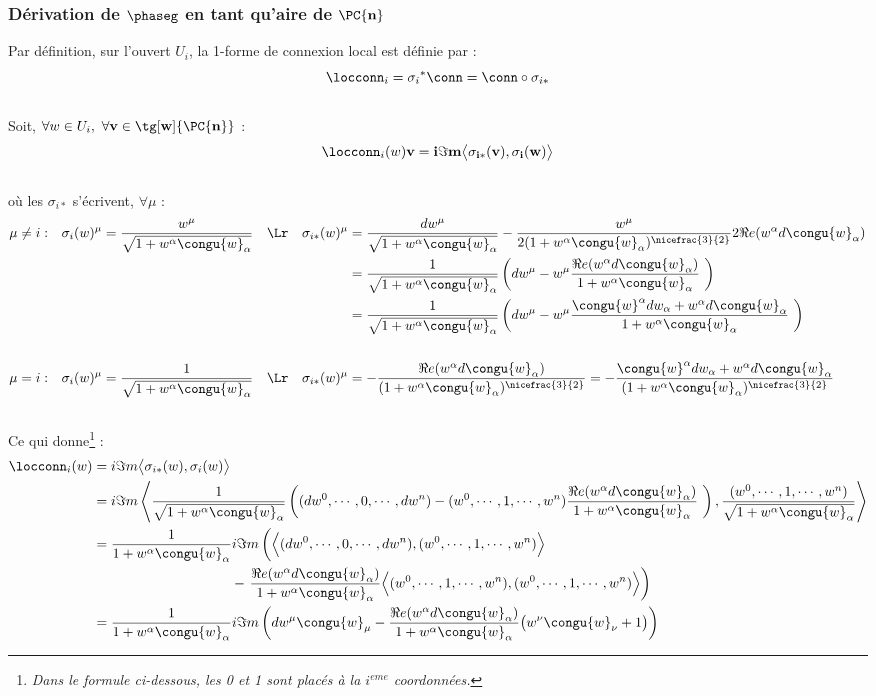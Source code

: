 \subsubsection{Dérivation de $\bf{\phaseg}$ en tant qu'aire de $\bf{\PC{n}}$} \label{ann:phaseg=aire}

Par définition, sur l'ouvert $U_i$, la 1-forme de connexion local est définie par :
\[\locconn_i = {\sigma_i}^*\conn = \conn\circ \sigma_{i*}\]
\\
Soit, $\forall w\in U_i,\ \forall \bf{v}\in\tg[w]{\PC{n}}$ :
\[\locconn_i(w)\bf{v}= i\Im m \big\langle \sigma_{i*}(\bf{v}), \sigma_i(w) \big\rangle\]
\\
où les $\sigma_{i*}$ s'écrivent, $\forall \mu$ :
\begin{align*}
	\mu &\neq i : &  \sigma_i(w)^\mu = \frac{w^\mu}{\sqrt{1 + w^\alpha\congu{w}_\alpha}}\quad \Lr\quad
	\sigma_{i*}(w)^\mu &= \frac{dw^\mu}{\sqrt{1 + w^\alpha\congu{w}_\alpha}} - \frac{w^\mu}{2(1 + w^\alpha\congu{w}_\alpha)^{\nicefrac{3}{2}}}2\Re e(w^\alpha d\congu{w}_\alpha) \\
	&  &  &= \frac{1}{\sqrt{1 + w^\alpha\congu{w}_\alpha}}\left(dw^\mu - w^\mu \frac{\Re e(w^\alpha d\congu{w}_\alpha)}{1 + w^\alpha\congu{w}_\alpha}\ \right) \\
	&  &  &= \frac{1}{\sqrt{1 + w^\alpha\congu{w}_\alpha}}\left(dw^\mu - w^\mu \frac{\congu{w}^\alpha dw_\alpha + w^\alpha d\congu{w}_\alpha}{1 + w^\alpha\congu{w}_\alpha}\ \right)
	\\ \\
	\mu &= i :  &  \sigma_i(w)^\mu = \frac{1}{\sqrt{1 + w^\alpha\congu{w}_\alpha}}\quad \Lr\quad
	\sigma_{i*}(w)^\mu &= - \frac{\Re e(w^\alpha d\congu{w}_\alpha)}{(1 + w^\alpha\congu{w}_\alpha)^{\nicefrac{3}{2}}} = - \frac{\congu{w}^\alpha dw_\alpha + w^\alpha d\congu{w}_\alpha}{(1 + w^\alpha\congu{w}_\alpha)^{\nicefrac{3}{2}}}
\end{align*}
\\
Ce qui donne\footnote{\itshape
	Dans le formule ci-dessous, les 0 et 1 sont placés à la $i^{eme}$ coordonnées.
} :
\begin{align*}
	\locconn_i(w) &= i\Im m \big\langle \sigma_{i*}(w), \sigma_i(w) \big\rangle \\
	&= i\Im m \left\langle \frac{1}{\sqrt{1 + w^\alpha\congu{w}_\alpha}}\left((dw^0,\cdots , 0, \cdots, dw^n) - (w^0,\cdots , 1, \cdots, w^n) \frac{\Re e(w^\alpha d\congu{w}_\alpha)}{1 + w^\alpha\congu{w}_\alpha}\ \right), \frac{(w^0,\cdots , 1, \cdots, w^n)}{\sqrt{1 + w^\alpha\congu{w}_\alpha}} \right\rangle \\
	&= \frac{1}{1 + w^\alpha\congu{w}_\alpha} i\Im m \left( \Big\langle (dw^0,\cdots , 0, \cdots, dw^n), (w^0,\cdots , 1, \cdots, w^n) \Big\rangle \bigg. \right. \\
	&\qquad\qquad\qquad\qquad\qquad - \left.  \frac{\Re e(w^\alpha d\congu{w}_\alpha)}{1 + w^\alpha\congu{w}_\alpha}\Big\langle (w^0,\cdots , 1, \cdots, w^n) , (w^0,\cdots , 1, \cdots, w^n) \Big\rangle \right) \\
	&= \frac{1}{1 + w^\alpha\congu{w}_\alpha} i\Im m \left( dw^\mu\congu{w}_\mu -  \frac{\Re e(w^\alpha d\congu{w}_\alpha)}{1 + w^\alpha\congu{w}_\alpha}\big( w^\nu\congu{w}_\nu +1 \big) \right)
\end{align*}
